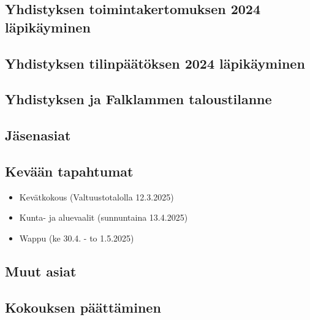 \documentclass[a4paper,12pt]{article}
\begin{document}
\subsection{Yhdistyksen toimintakertomuksen 2024 läpikäyminen}
\subsection{Yhdistyksen tilinpäätöksen 2024 läpikäyminen}
\subsection{Yhdistyksen ja Falklammen taloustilanne}
\subsection{Jäsenasiat}
\subsection{Kevään tapahtumat}
\begin{itemize}
\item{Kevätkokous} (Valtuustotalolla 12.3.2025)
\item{Kunta- ja aluevaalit} (sunnuntaina 13.4.2025)
\item{Wappu} (ke 30.4. - to 1.5.2025)
\end{itemize}
\subsection{Muut asiat}
\subsection{Kokouksen päättäminen}
\end{document}
